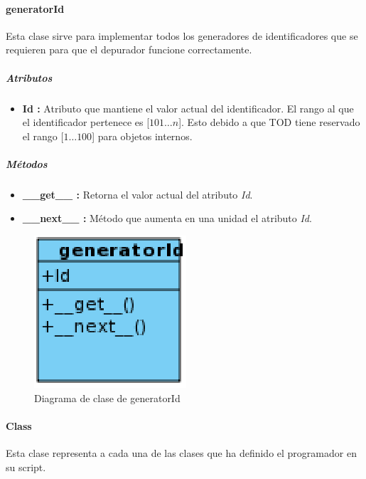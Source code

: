 \documentclass[12pt,legalpaper]{report}
\begin{document}
					
				\paragraph{generatorId}

Esta clase sirve para implementar todos los generadores de identificadores que se requieren para que el depurador funcione correctamente.

					\subparagraph{Atributos}

\begin{itemize}
	\item \textbf{Id :} Atributo que mantiene el valor actual del identificador.  El rango al que el identificador pertenece es [$101 \dots n$].  Esto debido a que TOD tiene reservado el rango [$1 \dots 100$] para objetos internos.
\end{itemize}					
					
					\subparagraph{Métodos}						

\begin{itemize}
	\item \textbf{\_\_get\_\_ :} Retorna el valor actual del atributo \textit{Id}.
	\item \textbf{\_\_next\_\_ :} Método que aumenta en una unidad el atributo \textit{Id}.
\end{itemize}					

					
\begin{figure}[!ht]
	\centering
	\includegraphics[scale=0.6]{images/Clases/generatorId.eps}
	\caption{Diagrama de clase de generatorId}
\end{figure}
					
				\paragraph{Class}
				
Esta clase representa a cada una de las clases que ha definido el programador en su script.				
				
\end{document}
